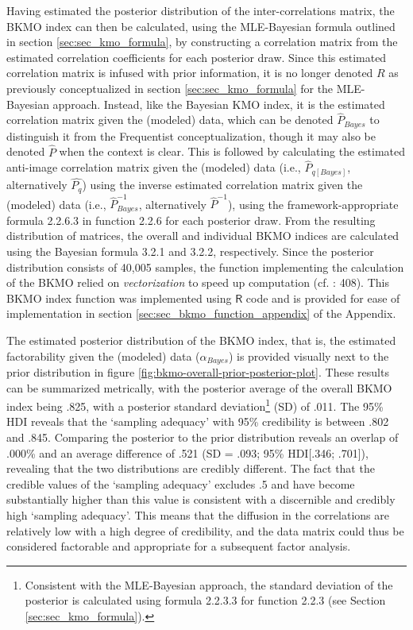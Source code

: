 \documentclass[
  10pt,
  a4paper,
  twoside]{article}
\begin{document}
Having estimated the posterior distribution of the inter-correlations matrix, the BKMO index can then be calculated, using the MLE-Bayesian formula outlined in section \ref{sec:sec_kmo_formula}, by constructing a correlation matrix from the estimated correlation coefficients for each posterior draw. Since this estimated correlation matrix is infused with prior information, it is no longer denoted \(R\) as previously conceptualized in section \ref{sec:sec_kmo_formula} for the MLE-Bayesian approach. Instead, like the Bayesian KMO index, it is the estimated correlation matrix given the (modeled) data, which can be denoted \(\hat{P}_{Bayes}\) to distinguish it from the Frequentist conceptualization, though it may also be denoted \(\hat{P}\) when the context is clear. This is followed by calculating the estimated anti-image correlation matrix given the (modeled) data (i.e., \(\hat{P}_{q[Bayes]}\), alternatively \(\hat{P_q}\)) using the inverse estimated correlation matrix given the (modeled) data (i.e., \(\hat{P}^{-1}_{Bayes}\), alternatively \(\hat{P}^{-1}\)), using the framework-appropriate formula 2.2.6.3 in function 2.2.6 for each posterior draw. From the resulting distribution of matrices, the overall and individual BKMO indices are calculated using the Bayesian formula 3.2.1 and 3.2.2, respectively. Since the posterior distribution consists of 40,005 samples, the function implementing the calculation of the BKMO relied on \emph{vectorization} to speed up computation (cf. : 408). This BKMO index function was implemented using \(\textsf{R}\) code and is provided for ease of implementation in section \ref{sec:sec_bkmo_function_appendix} of the Appendix.

The estimated posterior distribution of the BKMO index, that is, the estimated factorability given the (modeled) data (\(\hat{\alpha}_{Bayes}\)) is provided visually next to the prior distribution in figure \ref{fig:bkmo-overall-prior-posterior-plot}. These results can be summarized metrically, with the posterior average of the overall BKMO index being .825, with a posterior standard deviation\footnote{Consistent with the MLE-Bayesian approach, the standard deviation of the posterior is calculated using formula 2.2.3.3 for function 2.2.3 (see Section \ref{sec:sec_kmo_formula}).} (SD) of .011. The 95\% HDI reveals that the `sampling adequacy' with 95\% credibility is between .802 and .845. Comparing the posterior to the prior distribution reveals an overlap of .000\% and an average difference of .521 (SD = .093; 95\% HDI{[}.346; .701{]}), revealing that the two distributions are credibly different. The fact that the credible values of the `sampling adequacy' excludes .5 and have become substantially higher than this value is consistent with a discernible and credibly high `sampling adequacy'. This means that the diffusion in the correlations are relatively low with a high degree of credibility, and the data matrix could thus be considered factorable and appropriate for a subsequent factor analysis.
\end{document}
